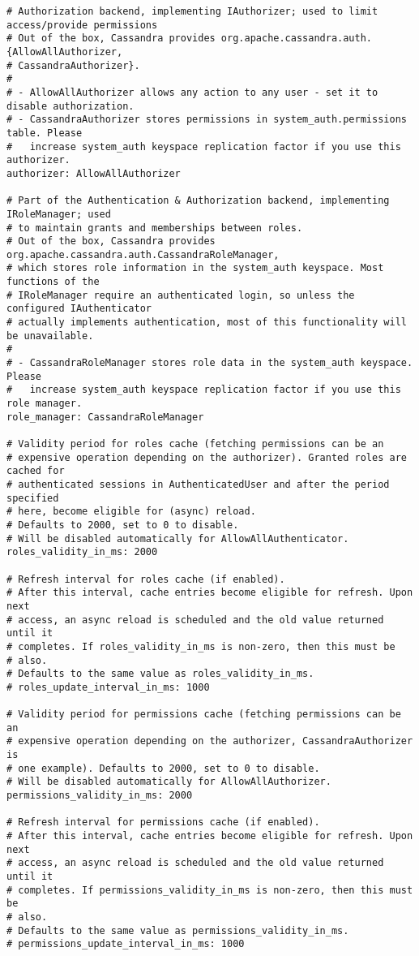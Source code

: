 \begin{verbatim}
# Authorization backend, implementing IAuthorizer; used to limit access/provide permissions
# Out of the box, Cassandra provides org.apache.cassandra.auth.{AllowAllAuthorizer,
# CassandraAuthorizer}.
#
# - AllowAllAuthorizer allows any action to any user - set it to disable authorization.
# - CassandraAuthorizer stores permissions in system_auth.permissions table. Please
#   increase system_auth keyspace replication factor if you use this authorizer.
authorizer: AllowAllAuthorizer

# Part of the Authentication & Authorization backend, implementing IRoleManager; used
# to maintain grants and memberships between roles.
# Out of the box, Cassandra provides org.apache.cassandra.auth.CassandraRoleManager,
# which stores role information in the system_auth keyspace. Most functions of the
# IRoleManager require an authenticated login, so unless the configured IAuthenticator
# actually implements authentication, most of this functionality will be unavailable.
#
# - CassandraRoleManager stores role data in the system_auth keyspace. Please
#   increase system_auth keyspace replication factor if you use this role manager.
role_manager: CassandraRoleManager

# Validity period for roles cache (fetching permissions can be an
# expensive operation depending on the authorizer). Granted roles are cached for
# authenticated sessions in AuthenticatedUser and after the period specified
# here, become eligible for (async) reload.
# Defaults to 2000, set to 0 to disable.
# Will be disabled automatically for AllowAllAuthenticator.
roles_validity_in_ms: 2000

# Refresh interval for roles cache (if enabled).
# After this interval, cache entries become eligible for refresh. Upon next
# access, an async reload is scheduled and the old value returned until it
# completes. If roles_validity_in_ms is non-zero, then this must be
# also.
# Defaults to the same value as roles_validity_in_ms.
# roles_update_interval_in_ms: 1000

# Validity period for permissions cache (fetching permissions can be an
# expensive operation depending on the authorizer, CassandraAuthorizer is
# one example). Defaults to 2000, set to 0 to disable.
# Will be disabled automatically for AllowAllAuthorizer.
permissions_validity_in_ms: 2000

# Refresh interval for permissions cache (if enabled).
# After this interval, cache entries become eligible for refresh. Upon next
# access, an async reload is scheduled and the old value returned until it
# completes. If permissions_validity_in_ms is non-zero, then this must be
# also.
# Defaults to the same value as permissions_validity_in_ms.
# permissions_update_interval_in_ms: 1000


\end{verbatim}
